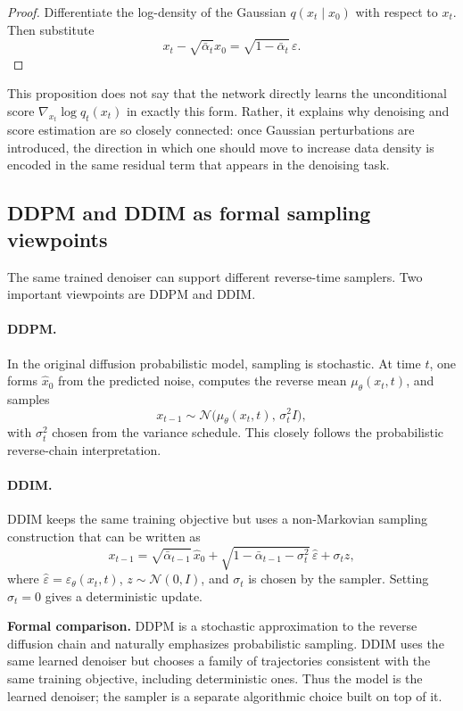 \begin{proof}
Differentiate the log-density of the Gaussian $q(x_t\mid x_0)$ with respect to $x_t$.
Then substitute
\[
x_t-\sqrt{\bar\alpha_t}x_0=\sqrt{1-\bar\alpha_t}\,\varepsilon.
\]
\end{proof}

This proposition does not say that the network directly learns the unconditional score $\nabla_{x_t}\log q_t(x_t)$ in exactly this form.
Rather, it explains why denoising and score estimation are so closely connected: once Gaussian perturbations are introduced, the direction in which one should move to increase data density is encoded in the same residual term that appears in the denoising task.

\subsection*{DDPM and DDIM as formal sampling viewpoints}

The same trained denoiser can support different reverse-time samplers.
Two important viewpoints are DDPM and DDIM.

\paragraph{DDPM.}
In the original diffusion probabilistic model, sampling is stochastic.
At time $t$, one forms $\hat x_0$ from the predicted noise, computes the reverse mean $\mu_\theta(x_t,t)$, and samples
\[
x_{t-1} \sim \mathcal{N}\!\bigl(\mu_\theta(x_t,t),\,\sigma_t^2 I\bigr),
\]
with $\sigma_t^2$ chosen from the variance schedule.
This closely follows the probabilistic reverse-chain interpretation.

\paragraph{DDIM.}
DDIM keeps the same training objective but uses a non-Markovian sampling construction that can be written as
\[
x_{t-1}
=
\sqrt{\bar\alpha_{t-1}}\,\hat x_0
+
\sqrt{1-\bar\alpha_{t-1}-\sigma_t^2}\,\hat\varepsilon
+
\sigma_t z,
\]
where $\hat\varepsilon=\varepsilon_\theta(x_t,t)$, $z\sim\mathcal{N}(0,I)$, and $\sigma_t$ is chosen by the sampler.
Setting $\sigma_t=0$ gives a deterministic update.

\medskip

\noindent
\textbf{Formal comparison.}
DDPM is a stochastic approximation to the reverse diffusion chain and naturally emphasizes probabilistic sampling.
DDIM uses the same learned denoiser but chooses a family of trajectories consistent with the same training objective, including deterministic ones.
Thus the model is the learned denoiser; the sampler is a separate algorithmic choice built on top of it.

